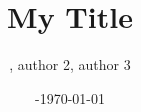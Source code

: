 \documentclass[aspectratio=43,table]{beamer}
\title{My Title}
\author{\textbf{\presenter}, author 2, author 3}
\date{\venue\;-\;\today}
\begin{document}


\begin{refsegment}
	
\end{refsegment}






\end{document}
